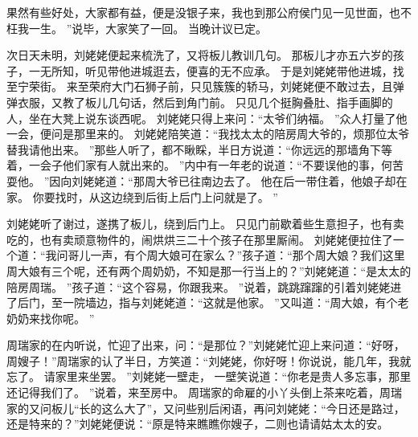果然有些好处，大家都有益，便是没银子来，我也到那公府侯门见一见世面，也不枉我一生。
”说毕，大家笑了一回。
当晚计议已定。
\par
次日天未明，刘姥姥便起来梳洗了，又将板儿教训几句。
那板儿才亦五六岁的孩子，一无所知，听见带他进城逛去，便喜的无不应承。
于是刘姥姥带他进城，找至宁荣街。
来至荣府大门石狮子前，只见簇簇的轿马，刘姥姥便不敢过去，且弹弹衣服，又教了板儿几句话，然后\ceng{}到角门前。
只见几个挺胸叠肚、指手画脚的人，坐在大凳上说东谈西呢。
刘姥姥只得上来问：“太爷们纳福。
”众人打量了他一会，便问是那里来的。
刘姥姥陪笑道：“我找太太的陪房周大爷的，烦那位太爷替我请他出来。
”那些人听了，都不瞅睬，半日方说道：“你远远的那墙角下等着，一会子他们家有人就出来的。
”内中有一年老的说道：“不要误他的事，何苦耍他。
”因向刘姥姥道：“那周大爷已往南边去了。
他在后一带住着，他娘子却在家。
你要找时，从这边绕到后街上后门上问就是了。
”
\par
刘姥姥听了谢过，遂携了板儿，绕到后门上。
只见门前歇着些生意担子，也有卖吃的，也有卖顽意物件的，闹烘烘三二十个孩子在那里厮闹。
刘姥姥便拉住了一个道：“我问哥儿一声，有个周大娘可在家么？”孩子道：“那个周大娘？我们这里周大娘有三个呢，还有两个周奶奶，不知是那一行当上的？”刘姥姥道：“是太太的陪房周瑞。
”孩子道：“这个容易，你跟我来。
”说着，跳跳蹿蹿的引着刘姥姥进了后门，至一院墙边，指与刘姥姥道：“这就是他家。
”又叫道：“周大娘，有个老奶奶来找你呢。
”\par
周瑞家的在内听说，忙迎了出来，问：“是那位？”刘姥姥忙迎上来问道：“好呀，周嫂子！”周瑞家的认了半日，方笑道：“刘姥姥，你好呀！你说说，能几年，我就忘了。
请家里来坐罢。
”刘姥姥一壁走，
一壁笑说道：“你老是贵人多忘事，那里还记得我们了。
”说着，来至房中。
周瑞家的命雇的小丫头倒上茶来吃着，周瑞家的又问板儿“长的这么大了”，又问些别后闲语，再问刘姥姥：“今日还是路过，还是特来的？”刘姥姥便说：“原是特来瞧瞧你嫂子，二则也请请姑太太的安。
